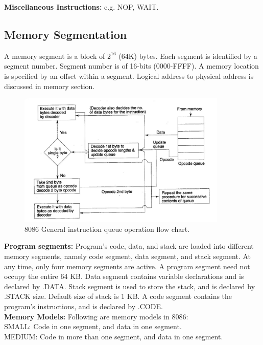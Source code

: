 \documentclass[12pt, a4paper]{scrartcl}
\begin{document}
	\textbf{Miscellaneous Instructions: }e.g. NOP, WAIT. 
	
	\subsection{Memory Segmentation} A memory segment is a block of $2^{16}$ (64K) bytes. Each segment is identified by a segment number. Segment number is of 16-bits (0000-FFFF). A memory location is specified by an offset within a segment. Logical address to physical address is discussed in memory section.\\
	
	\begin{figure}[h]
		\centering
		\includegraphics[width=0.89\textwidth]{images/8086-instruction-queue-operation.png}
		\caption{8086 General instruction queue operation flow chart.}
		\label{image-16}
	\end{figure}
	
	\textbf{Program segments: }Program's code, data, and stack are loaded into different memory segments, namely code segment, data segment, and stack segment. At any time, only four memory segments are active. A program segment need not occupy the entire 64 KB. Data segment contains variable declarations and is declared by .DATA. Stack segment is used to store the stack, and is declared by .STACK size. Default size of stack is 1 KB. A code segment contains the program's instructions, and is declared by .CODE.\\
	
	\textbf{Memory Models: }Following are memory models in 8086:\\
	
	SMALL: Code in one segment, and data in one segment.\\
	
	MEDIUM: Code in more than one segment, and data in one segment.\\
	
\end{document}
